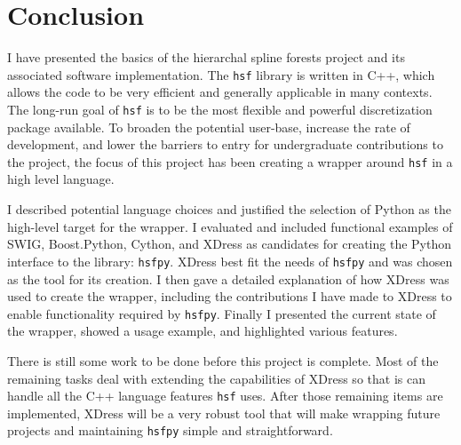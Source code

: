 \section{Conclusion} \label{sec:conclusion}


  I have presented the basics of the hierarchal spline forests project and its associated software implementation. The \texttt{hsf} library is written in C++, which allows the code to be very efficient and generally applicable in many contexts. The long-run goal of \texttt{hsf} is to be the most flexible and powerful discretization package available. To broaden the potential user-base, increase the rate of development, and lower the barriers to entry for undergraduate contributions to the project, the focus of this project has been creating a wrapper around \texttt{hsf} in a high level language.

  I described potential language choices and justified the selection of Python as the high-level target for the wrapper. I evaluated and included functional examples of SWIG, Boost.Python, Cython, and XDress as candidates for creating the Python interface to the library: \texttt{hsfpy}. XDress best fit the needs of \texttt{hsfpy} and was chosen as the tool for its creation. I then gave a detailed explanation of how XDress was used to create the wrapper, including the contributions I have made to XDress to enable functionality required by \texttt{hsfpy}. Finally I presented the current state of the wrapper, showed a usage example, and highlighted various features.

  There is still some work to be done before this project is complete. Most of the remaining tasks deal with extending the capabilities of XDress so that is can handle all the C++ language features \texttt{hsf} uses. After those remaining items are implemented, XDress will be a very robust tool that will make wrapping future projects and maintaining \texttt{hsfpy} simple and straightforward.

